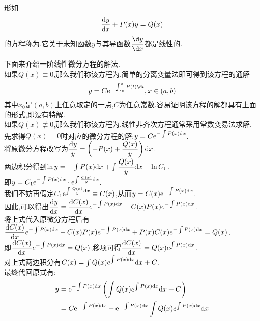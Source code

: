 \documentclass{ctexart}
\begin{document}
\begin{theorem}[2.3 一阶线性微分方程]
    形如
    \[\dfrac{\mathrm{d} y}{\mathrm{d} x}+P(x)y=Q(x)\]
    的方程称为.它关于未知函数$y$与其导函数$\dfrac{\d y}{\d x}$都是线性的.
\end{theorem}
下面来介绍一阶线性微分方程的解法.\\
如果$Q(x)\equiv0$,那么我们称该方程为.简单的分离变量法即可得到该方程的通解
\[y=C\e^{-\int_{x_0}^{x}P(t)\d t},x\in(a,b)\]
其中$x_0$是$(a,b)$上任意取定的一点,$C$为任意常数.容易证明该方程的解都具有上面的形式,即没有特解.\\
如果$Q(x)\not\equiv0$,那么我们称该方程为.线性非齐次方程通常采用常数变易法求解.\\
先求得$Q(x)=0$时对应的微分方程的解:$y=C\mathrm{e}^{-\int{P(x)\mathrm{d}x}}$.\\
将原微分方程改写为$\dfrac{\mathrm{d} y}{y}=\left(-P(x)+\dfrac{Q(x)}{y}\right)\mathrm{d} x$.\\
两边积分得到$\ln{y}=-\int{P(x)\mathrm{d}x}+\int{\dfrac{Q(x)}{y}\mathrm{d}x}+\ln{C_1}$.\\
即$y=C_1\mathrm{e}^{-\int{P(x)\mathrm{d}x}}\cdot\mathrm{e}^{\int{\frac{Q(x)}{y}\mathrm{d}x}}$.\\
我们不妨再假定$C_1\mathrm{e}^{\int{\frac{Q(x)}{y}\mathrm{d}x}}\equiv C(x)$,从而$y=C(x)\mathrm{e}^{-\int{P(x)\mathrm{d}x}}$.\\
因此,可以得出$\dfrac{\mathrm{d} y}{\mathrm{d} x}=\dfrac{\mathrm{d} C(x)}{\mathrm{d} x}e^{-\int{P(x)\mathrm{d}x}}-C(x)P(x)e^{-\int{P(x)\mathrm{d}x}}$.\\
将上式代入原微分方程后有$\dfrac{\mathrm{d} C(x)}{\mathrm{d} x}e^{-\int{P(x)\mathrm{d}x}}-C(x)P(x)e^{-\int{P(x)\mathrm{d}x}}+P(x)C(x)e^{-\int{P(x)\mathrm{d}x}}=Q(x)$.\\
即$\dfrac{\mathrm{d} C(x)}{\mathrm{d} x}e^{-\int{P(x)\mathrm{d}x}}=Q(x)$,移项可得$\dfrac{\mathrm{d} C(x)}{\mathrm{d} x}=Q(x)e^{\int{P(x)\mathrm{d}x}}$.\\
对上式两边积分有$C(x)=\int{Q(x)e^{\int{P(x)\mathrm{d}x}}\mathrm{d}x}+C$.\\
最终代回原式有:
$$\begin{aligned}
    y &= \mathrm{e}^{-\int{P(x)\mathrm{d}x}}\left(\int{Q(x)e^{\int{P(x)\mathrm{d}x}}\mathrm{d}x}+C\right) \\
      &= C\mathrm{e}^{-\int{P(x)\mathrm{d}x}}+\mathrm{e}^{-\int{P(x)\mathrm{d}x}}\int{Q(x)e^{\int{P(x)\mathrm{d}x}}\mathrm{d}x}
\end{aligned}$$
\end{document}
